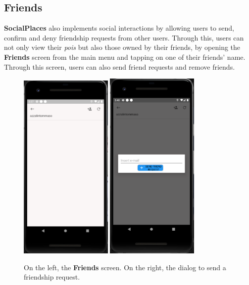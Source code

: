 \documentclass[../../main]{subfiles}
\begin{document}
\subsection{Friends}
\label{ss:final-friends}

\textbf{SocialPlaces} also implements social interactions by allowing users to send, confirm and deny friendship requests from other users.
Through this, users can not only view their \textit{pois} but also those owned by their friends, by opening the \textbf{Friends} screen from the main menu and tapping on one of their friends' name.
Through this screen, users can also send friend requests and remove friends.
\begin{figure}[H]
    \centering
    \includegraphics[width=0.4\textwidth]{images/app/friend/friend_overwiew}
    \includegraphics[width=0.4\textwidth]{images/app/friend/send_request}
    \caption{On the left, the \textbf{Friends} screen. On the right, the dialog to send a friendship request.}
\end{figure}
\end{document}
